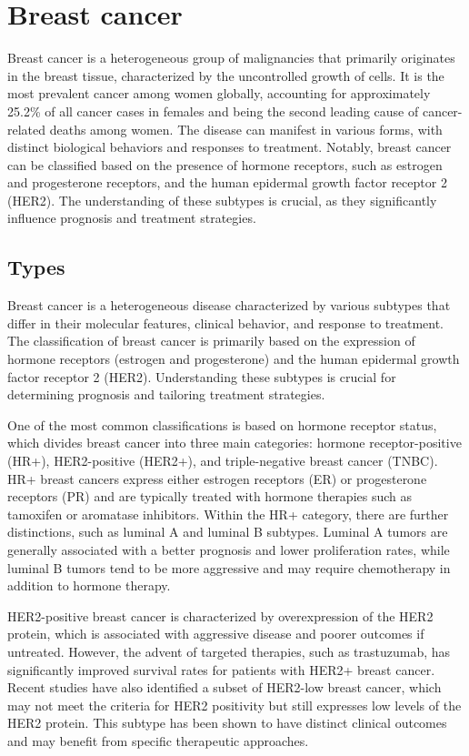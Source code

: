 \section{Breast cancer}
Breast cancer is a heterogeneous group of malignancies that primarily originates
in the breast tissue, characterized by the uncontrolled growth of cells. It is
the most prevalent cancer among women globally, accounting for approximately
25.2\% of all cancer cases in females and being the second leading cause of
cancer-related deaths among women\supercite{pace_breast_2016}. The disease can
manifest in various forms, with distinct biological behaviors and responses to
treatment. Notably, breast cancer can be classified based on the presence of
hormone receptors, such as estrogen and progesterone receptors, and the human
epidermal growth factor receptor 2 (HER2)\supercite{eccles_critical_2013}. The
understanding of these subtypes is crucial, as they significantly influence
prognosis and treatment strategies.

\subsection{Types}

Breast cancer is a heterogeneous disease characterized by various subtypes that
differ in their molecular features, clinical behavior, and response to
treatment. The classification of breast cancer is primarily based on the
expression of hormone receptors (estrogen and progesterone) and the human
epidermal growth factor receptor 2 (HER2). Understanding these subtypes is
crucial for determining prognosis and tailoring treatment strategies.

One of the most common classifications is based on hormone receptor status,
which divides breast cancer into three main categories: hormone
receptor-positive (HR+), HER2-positive (HER2+), and triple-negative breast
cancer (TNBC). HR+ breast cancers express either estrogen receptors (ER) or
progesterone receptors (PR) and are typically treated with hormone therapies
such as tamoxifen or aromatase inhibitors\supercite{geyer_molecular_2012}.
Within the HR+ category, there are further distinctions, such as luminal A and
luminal B subtypes. Luminal A tumors are generally associated with a better
prognosis and lower proliferation rates, while luminal B tumors tend to be more
aggressive and may require chemotherapy in addition to hormone
therapy\supercite{geyer_molecular_2012}.

HER2-positive breast cancer is characterized by overexpression of the HER2
protein, which is associated with aggressive disease and poorer outcomes if
untreated. However, the advent of targeted therapies, such as trastuzumab, has
significantly improved survival rates for patients with HER2+ breast
cancer\supercite{modi_antitumor_2020}. Recent studies have also identified a
subset of HER2-low breast cancer, which may not meet the criteria for HER2
positivity but still expresses low levels of the HER2 protein. This subtype has
been shown to have distinct clinical outcomes and may benefit from specific
therapeutic approaches\supercite{won_clinical_2022,mutai_prognostic_2021}.

